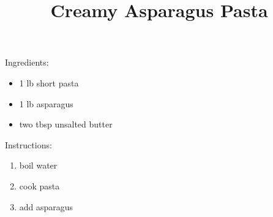 \documentclass{article}
\begin{document}
\title{\Huge{}\selectfont
Creamy Asparagus Pasta
}
\date{}
\maketitle

\begin{mdframed}
{\Large{}\selectfont
  Ingredients:}

\begin{itemize}
\item 1 lb short pasta
\item 1 lb asparagus
\item two tbsp unsalted butter
\end{itemize}
\end{mdframed}
\begin{mdframed}
{\Large{}\selectfont
  Instructions:}

\begin{enumerate}
\item boil water
\item cook pasta
\item add asparagus
\end{enumerate}
\end{mdframed}
\end{document}
